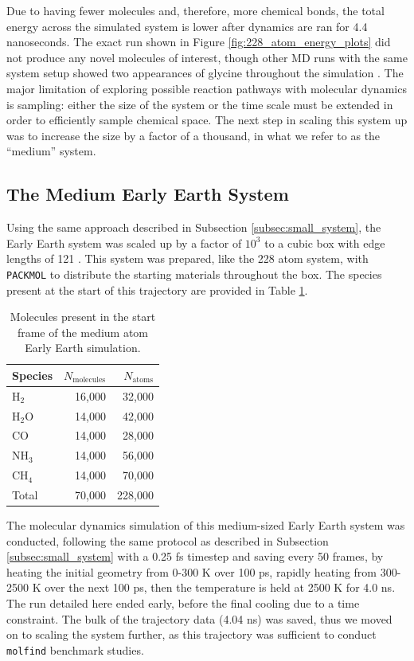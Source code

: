 Due to having fewer molecules and, therefore, more chemical bonds, the total energy across the simulated system is lower after dynamics are ran for 4.4 nanoseconds.
The exact run shown in Figure \ref{fig:228_atom_energy_plots} did not produce any novel molecules of interest, though other MD runs with the same system setup showed two appearances of glycine throughout the simulation \cite{lammps_ani}.
The major limitation of exploring possible reaction pathways with molecular dynamics is sampling: either the size of the system or the time scale must be extended in order to efficiently sample chemical space.
The next step in scaling this system up was to increase the size by a factor of a thousand, in what we refer to as the ``medium'' system.


\subsection{The Medium Early Earth System}
\label{subsec:medium_system}

Using the same approach described in Subsection \ref{subsec:small_system}, the Early Earth system was scaled up by a factor of $10^3$ to a cubic box with edge lengths of 121 \angstrom.
This system was prepared, like the 228 atom system, with \verb|PACKMOL| to distribute the starting materials throughout the box.
The species present at the start of this trajectory are provided in Table \ref{tbl:228k_start_counts}.

\begin{table}[h!]
\centering
\caption[Molecules in the first frame of the 228,000 atom run]{Molecules present in the start frame of the medium atom Early Earth simulation.
}\label{tbl:228k_start_counts}
\begin{tabularx}{0.33333\textwidth}{lrr}  
\toprule
Species & $N_\text{molecules}$ & $N_\text{atoms}$ \\
\midrule
$\text{H}_2$ & 16,000 & 32,000 \\
$\text{H}_2\text{O}$ & 14,000 & 42,000 \\
CO & 14,000 & 28,000 \\
$\text{NH}_3$ & 14,000 & 56,000 \\ 
$\text{CH}_4$ & 14,000 & 70,000 \\
Total & 70,000 & 228,000 \\
\bottomrule
\end{tabularx}
\end{table}

The molecular dynamics simulation of this medium-sized Early Earth system was conducted, following the same protocol as described in Subsection \ref{subsec:small_system} with a 0.25 fs timestep and saving every 50 frames, by heating the initial geometry from 0-300 K over 100 ps, rapidly heating from 300-2500 K over the next 100 ps, then the temperature is held at 2500 K for 4.0 ns.
The run detailed here ended early, before the final cooling due to a time constraint.
The bulk of the trajectory data (4.04 ns) was saved, thus we moved on to scaling the system further, as this trajectory was sufficient to conduct \verb|molfind| benchmark studies.

